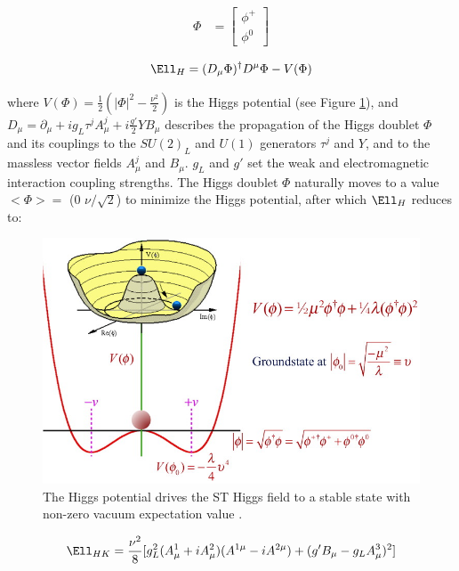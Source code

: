 \begin{align}
	\Phi &= \begin{bmatrix}
	\phi^{+} \\
	\phi^{0}
	\end{bmatrix}
\end{align}

\begin{equation}
	\Ell_{H} = (D_{\mu}\Phi)^{\dagger}D^{\mu}\Phi - V(\Phi)
\end{equation}

where $V(\Phi) = \frac{1}{2}(|\Phi|^{2} - \frac{\nu^{2}}{2})$ is the Higgs potential (see Figure \ref{fig:smHiggsPotential}), and 
$D_{\mu} = \partial_{\mu} + ig_{L}\tau^{j}A^{j}_{\mu} + i\frac{g'}{2}YB_{\mu}$ describes the propagation 
of the Higgs doublet $\Phi$ and its couplings to the $SU(2)_{L}$ and $U(1)$ generators $\tau^{j}$ and $Y$, 
and to the massless vector fields $A^{j}_{\mu}$ and $B_{\mu}$.  $g_{L}$ and 
$g'$ set the weak and electromagnetic interaction coupling strengths.  The Higgs doublet $\Phi$ naturally 
moves to a value $<\Phi> =$ (0  $\nu/\sqrt{2}$) to minimize the Higgs potential, after which $\Ell_{H}$ reduces 
to:

\begin{figure}[h]
	\centering
	\includegraphics[width=1.0\textwidth]{figures/mexicanHatPotential.jpg}
	\caption{The Higgs potential drives the ST Higgs field to a stable state with non-zero vacuum expectation value \cite{higgsPotential}.}
	\label{fig:smHiggsPotential}
\end{figure}

\begin{equation}
	\Ell_{HK} = \frac{\nu^{2}}{8}[g^{2}_{L}(A^{1}_{\mu} + iA^{2}_{\mu})(A^{1\mu} - iA^{2\mu}) + (g'B_{\mu} - g_{L}A^{3}_{\mu})^{2}]
\end{equation}


